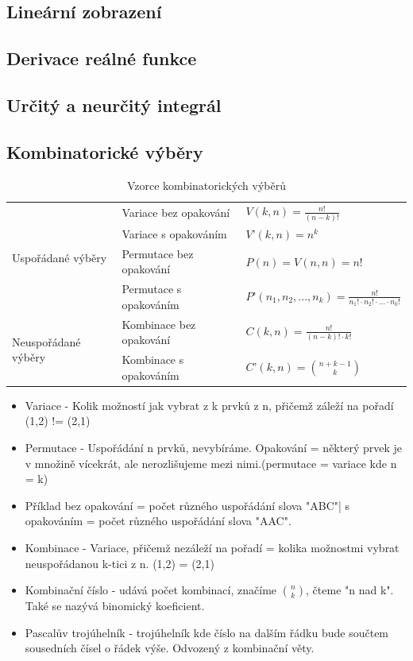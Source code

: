 \documentclass[10pt,a4paper]{article}
\begin{document}
\subsection{Lineární zobrazení}
\subsection{Derivace reálné funkce}
\subsection{Určitý a neurčitý integrál}
\subsection{Kombinatorické výběry}
\renewcommand{\arraystretch}{2} 
\begin{table}[ht]
\centering
\begin{tabular}{l|l|l}
\hline
\multirow{4}{*}{Uspořádané výběry}   & Variace bez opakování   & \(V(k, n) = \frac{n!}{(n-k)!}\) \\
                                     & Variace s opakováním    & \(V’(k, n) = n^k\) \\
                                     & Permutace bez opakování & \(P(n) = V(n, n) = n!\) \\
                                     & Permutace s opakováním  & \(P’(n_1,n_2,...,n_k) = \frac{ n!}{n_1!\cdot{}n_2!\cdot{}...\cdot{}n_k!}\) \\
\multirow{2}{*}{Neuspořádané výběry} & Kombinace bez opakování & \(C(k, n) = \frac{n!}{(n-k)!\cdot k!}\) \\
                                     & Kombinace s opakováním  & \(C’(k, n) = {n+k-1\choose k}\) \\ 
\hline
\end{tabular}
\caption{Vzorce kombinatorických výběrů}
\label{tab:kombVzorce}
\end{table}
\renewcommand{\arraystretch}{1} 
\begin{itemize}
\item Variace - Kolik možností jak vybrat z k prvků z n, přičemž záleží na pořadí (1,2) != (2,1)
\item Permutace - Uspořádání n prvků, nevybíráme. Opakování = některý prvek je v množině vícekrát, ale nerozlišujeme mezi nimi.(permutace = variace kde n = k)
\item Příklad bez opakování = počet různého uspořádání slova "ABC"| s opakováním = počet různého uspořádání slova "AAC".
\item Kombinace - Variace, přičemž nezáleží na pořadí = kolika možnostmi vybrat neuspořádanou k-tici z n. (1,2) = (2,1)
\item Kombinační číslo - udává počet kombinací, značíme $\binom{n}{k}$, čteme "n nad k". Také se nazývá binomický koeficient.
\item Pascalův trojúhelník - trojúhelník kde číslo na dalším řádku bude součtem sousedních čísel o řádek výše. Odvozený z kombinační věty.
\end{itemize}
\end{document}
